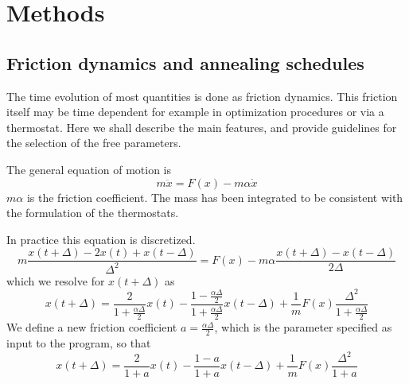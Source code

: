 \documentclass[final,12pt]{article}
\begin{document}
{{{{{{%
\newpage
\section{Methods}
\label{methods}
\subsection{Friction dynamics and annealing schedules}

The time evolution of most quantities is done as friction dynamics.
This friction itself may be time dependent for example in optimization
procedures or via a thermostat. Here we shall describe the main
features, and provide guidelines for the selection of the free
parameters.

The general equation of motion is 
\begin{displaymath}
m\ddot{x}=F(x)-m\alpha\dot{x}
\end{displaymath}
$m\alpha$ is the friction coefficient. The mass has been integrated to
be consistent with the formulation of the thermostats.

In practice this equation is discretized.
\begin{displaymath}
m\frac{x(t+\Delta)-2x(t)+x(t-\Delta)}{\Delta^2}
=F(x)-m\alpha\frac{x(t+\Delta)-x(t-\Delta)}{2\Delta}
\end{displaymath}
which we resolve for $x(t+\Delta)$ as
\begin{displaymath}
x(t+\Delta)=
\frac{2}{1+\frac{\alpha\Delta}{2}}x(t)
-\frac{1-\frac{\alpha\Delta}{2}}{1+\frac{\alpha\Delta}{2}}x(t-\Delta)
+\frac{1}{m}F(x)\frac{\Delta^2}{1+\frac{\alpha\Delta}{2}}
\end{displaymath}
We define a new friction coefficient $a=\frac{\alpha\Delta}{2}$, which is the
parameter specified as input to the program, so that
\begin{displaymath}
x(t+\Delta)=\frac{2}{1+a}x(t)-\frac{1-a}{1+a}x(t-\Delta)
+\frac{1}{m}F(x)\frac{\Delta^2}{1+a}
\end{displaymath}

}}}}}}
\end{document}
